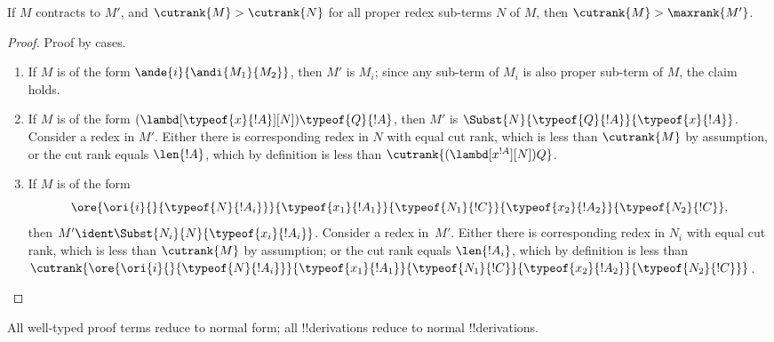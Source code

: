 \documentclass[../../../include/open-logic-section]{subfiles}
\begin{document}
\begin{lem}
  If $M$ contracts to $M'$, and $\cutrank{M} > \cutrank{N}$ for all
  proper redex sub-terms $N$ of $M$, then $\cutrank{M} >
  \maxrank{M'}$.
\end{lem}

\begin{proof}
  Proof by cases.
  \begin{enumerate}
  \item If $M$ is of the form $\ande{i}{\andi{M_1}{M_2}}$, then $M'$ is
    $M_i$; since any sub-term of $M_i$ is also proper
    sub-term of $M$, the claim holds.
  \item If $M$ is of the form
    $(\lambd[\typeof{x}{!A}][N])\typeof{Q}{!A}$, then $M'$ is
    $\Subst{N}{\typeof{Q}{!A}}{\typeof{x}{!A}}$.  Consider a redex in
    $M'$.  Either there is corresponding redex in $N$ with equal cut
    rank, which is less than $\cutrank{M}$ by assumption, or the cut
    rank equals $\len{!A}$, which by definition is less than
    $\cutrank{(\lambd[x^{!A}][N])Q}$.
  \item If $M$ is of the form
    \[
    \ore{\ori{i}{}{\typeof{N}{!A_i}}}
        {\typeof{x_1}{!A_1}}{\typeof{N_1}{!C}}
        {\typeof{x_2}{!A_2}}{\typeof{N_2}{!C}},
    \]
    then $M' \ident \Subst{N_i}{N}{\typeof{x_i}{!A_i}}$.  Consider a
    redex in~$M'$. Either there is corresponding redex in $N_i$ with
    equal cut rank, which is less than $\cutrank{M}$ by assumption; or
    the cut rank equals $\len{!A_i}$, which by definition is less than
    $\cutrank{\ore{\ori{i}{}{\typeof{N}{!A_i}}}
      {\typeof{x_1}{!A_1}}{\typeof{N_1}{!C}}
      {\typeof{x_2}{!A_2}}{\typeof{N_2}{!C}}}$.
  \end{enumerate}
\end{proof}

\begin{thm}
  All well-typed proof terms reduce to normal form; all !!{derivation}s reduce to
  normal !!{derivation}s.
\end{thm}
\end{document}
